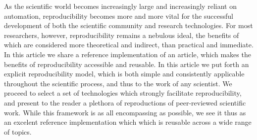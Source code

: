 As the scientific world becomes increasingly large and increasingly reliant on automation, reproducibility becomes more and more vital for the successful development of both the scientific community and research technologies.
For most researchers, however, reproducibility remains a nebulous ideal, the benefits of which are considered more theoretical and indirect, than practical and immediate.
In this article we share a reference implementation of an article, which makes the benefits of reproducibility accessible and reusable.
In this article we put forth an explicit reproducibility model, which is both simple and consistently applicable throughout the scientific process, and thus to the work of any scientist.
We proceed to select a set of technologies which strongly facilitate reproducibility, and present to the reader a plethora of reproductions of peer-reviewed scientific work.
While this framework is as all encompassing as possible, we see it thus as an excelent reference implementation which which is reusable across a wide range of topics.

